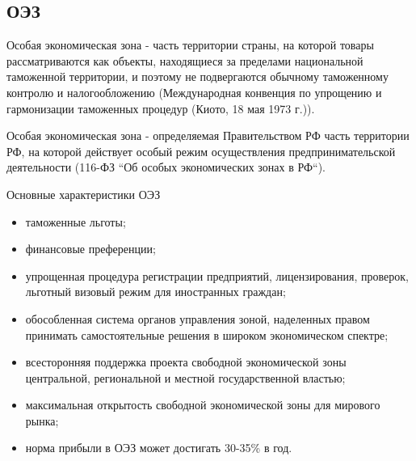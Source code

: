 \documentclass[_Venture_p3.tex]{subfiles}
\begin{document}
\subsection{ОЭЗ}

\begin{frame}[allowframebreaks]{}{}
\begin{block}{Особая экономическая зона}
	\quad
	- часть территории страны, на которой товары рассматриваются как объекты, находящиеся за пределами национальной таможенной территории, и поэтому не подвергаются обычному таможенному контролю и налогообложению (Международная конвенция по упрощению и гармонизации таможенных процедур (Киото, 18 мая 1973 г.)).
\end{block}

\pagebreak


\begin{block}{Особая экономическая зона}
	\quad
	- определяемая Правительством РФ часть территории РФ, на которой действует особый режим осуществления предпринимательской деятельности (116-ФЗ ``Об особых экономических зонах в РФ``).
\end{block}
\end{frame}



\begin{frame}[allowframebreaks]{Основные характеристики ОЭЗ}{}
\begin{itemize}
	\item таможенные льготы; 
	\item финансовые преференции;
	\item упрощенная процедура регистрации предприятий, лицензирования, проверок, льготный визовый режим для иностранных граждан;
	
	\pagebreak
	\item обособленная система органов управления зоной, наделенных правом принимать самостоятельные решения в широком экономическом спектре;
	\item всесторонняя поддержка проекта свободной экономической зоны центральной, региональной и местной государственной властью;

	\pagebreak
	\item максимальная открытость свободной экономической зоны для мирового рынка;
	\item норма прибыли в ОЭЗ может достигать 30-35\% в год.
\end{itemize}
\end{frame}
\end{document}
